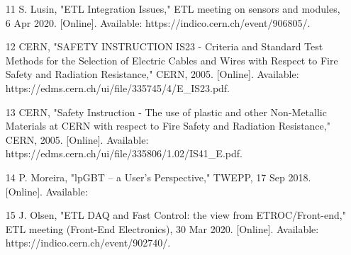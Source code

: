 \documentclass[11pt]{article}
\begin{document}
\begin{itemize}
  \item [11]  S. Lusin, "ETL Integration Issues," ETL meeting on sensors and modules, 6 Apr 2020. [Online]. Available: https://indico.cern.ch/event/906805/.
  \item [12]  CERN, "SAFETY INSTRUCTION IS23 - Criteria and Standard Test Methods for the Selection of Electric Cables and Wires with Respect to Fire Safety and Radiation Resistance," CERN, 2005. [Online]. Available:
    https://edms.cern.ch/ui/file/335745/4/E\_IS23.pdf.
  \item [13]  CERN, "Safety Instruction - The use of plastic and other Non-Metallic Materials at CERN with respect to Fire Safety and Radiation Resistance," CERN, 2005. [Online]. Available: https://edms.cern.ch/ui/file/335806/1.02/IS41\_E.pdf.
  \item [14]  P. Moreira, "lpGBT -- a User's Perspective," TWEPP, 17 Sep 2018. [Online]. Available:
  \item [15]  J. Olsen, "ETL DAQ and Fast Control: the view from ETROC/Front-end," ETL meeting (Front-End Electronics), 30 Mar 2020. [Online]. Available: https://indico.cern.ch/event/902740/.
\end{itemize}
\end{document}
